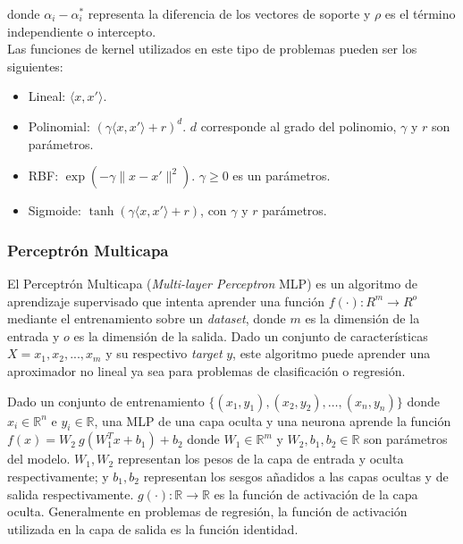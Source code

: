 \documentclass[spanish]{article}
\begin{document}
          donde $\alpha_i - \alpha_i^*$ representa la diferencia de los vectores de soporte y $\rho$ 
          es el término independiente o intercepto. \\
          
          Las funciones de kernel utilizados en este tipo de problemas pueden ser los siguientes:
          \begin{itemize}
            \item Lineal: $\langle x, x'\rangle$.
            \item Polinomial: $(\gamma \langle x, x'\rangle + r)^d$. $d$ corresponde al grado del 
              polinomio, $\gamma$ y $r$ son parámetros.
            \item RBF: $\exp(-\gamma \|x-x'\|^2)$. $\gamma\geq 0$ es un parámetros.
            \item Sigmoide: $\tanh(\gamma \langle x,x'\rangle + r)$, con $\gamma$ y $r$ parámetros.
          \end{itemize}
                
            
        \subsubsection{Perceptrón Multicapa}
            
          El Perceptrón Multicapa (\emph{Multi-layer Perceptron} MLP) \cite{rumelhart1986learning}
           es un algoritmo de aprendizaje 
          supervisado que intenta aprender una función $f(\cdot): R^m \rightarrow R^o$ mediante el 
          entrenamiento sobre un \emph{dataset}, donde $m$ es la dimensión de la entrada y $o$
          es la dimensión de la salida. Dado un conjunto de características $X = {x_1, x_2, ..., x_m}$ 
          y su respectivo \emph{target} $y$, este algoritmo puede aprender una aproximador no lineal 
          ya sea para problemas de clasificación o regresión. \medskip
          
          Dado un conjunto de entrenamiento $\{(x_1, y_1), (x_2, y_2), \ldots, (x_n, y_n)\}$ donde 
          $x_i \in \mathbb{R}^n$ e $y_i \in \mathbb{R}$, una MLP de una capa oculta y una neurona 
          aprende la función $f(x) = W_2 ~ g(W_1^T x + b_1) + b_2$ donde $W_1 \in \mathbb{R}^m$ y 
          $W_2, b_1, b_2 \in \mathbb{R}$ son parámetros del modelo. $W_1, W_2$ representan los 
          pesos de la capa de entrada y oculta respectivamente; y $b_1, b_2$ representan los sesgos 
          añadidos a las capas ocultas y de salida respectivamente. $g(\cdot): \mathbb{R} \rightarrow \mathbb{R}$ 
          es la función de activación de la capa oculta. Generalmente en problemas de regresión, 
          la función de activación utilizada en la capa de salida es la función identidad. \medskip
            
\end{document}
